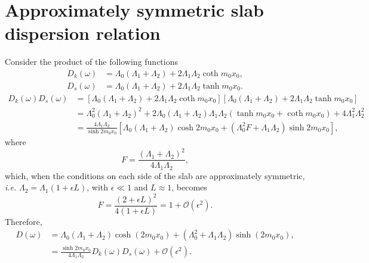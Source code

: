 \documentclass[12pt]{../style-files/ociamthesis}
\begin{document}
\section{Approximately symmetric slab dispersion relation}\label{app: approx sym DR}
Consider the product of the following functions
\begin{align}
D_k(\omega) &= \Lambda_0 (\Lambda_1 + \Lambda_2) + 2\Lambda_1\Lambda_2\coth{m_0x_0}, \\
D_s(\omega) &= \Lambda_0(\Lambda_1 + \Lambda_2) + 2\Lambda_1\Lambda_2\tanh{m_0x_0}.
\end{align}
\begin{align}
D_k(\omega) D_s(\omega) &= \left[ \Lambda_0 (\Lambda_1 + \Lambda_2) + 2\Lambda_1\Lambda_2\coth{m_0x_0} \right] \left[ \Lambda_0(\Lambda_1 + \Lambda_2) + 2\Lambda_1\Lambda_2\tanh{m_0x_0} \right] \\
&= \Lambda_0^2 (\Lambda_1 + \Lambda_2)^2 + 2\Lambda_0(\Lambda_1 + \Lambda_2)\Lambda_1\Lambda_2(\tanh{m_0x_0} + \coth{m_0x_0}) + 4\Lambda_1^2\Lambda_2^2 \\
&= \frac{4\Lambda_1\Lambda_2}{\sinh{2m_0x_0}} \left[ \Lambda_0(\Lambda_1 + \Lambda_2)\cosh{2m_0x_0} + (\Lambda_0^2F + \Lambda_1\Lambda_2)\sinh{2m_0x_0} \right],
\end{align}
where
\begin{equation}
F = \frac{(\Lambda_1 + \Lambda_2)^2}{4\Lambda_1\Lambda_2},
\end{equation}
which, when the conditions on each side of the slab are approximately symmetric, \textit{i.e.} $\Lambda_2 = \Lambda_1 (1 + \epsilon L)$, with $\epsilon \ll 1$ and $L \approx 1$, becomes
\begin{equation}
F = \frac{(2 + \epsilon L)^2}{4(1 + \epsilon L)} = 1 + \mathcal{O}(\epsilon^2).
\end{equation}
Therefore, 
\begin{align}
D(\omega) &= \Lambda_0(\Lambda_1 + \Lambda_2)\cosh(2m_0x_0) + (\Lambda_0^2 + \Lambda_1\Lambda_2)\sinh(2m_0x_0), \\
&= \frac{\sinh{2m_0x_0}}{4\Lambda_1\Lambda_2} D_k(\omega) D_s(\omega) + \mathcal{O}(\epsilon^2).
\end{align}
\end{document}
